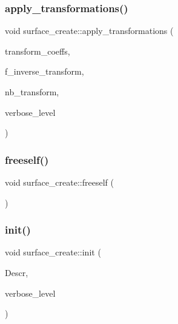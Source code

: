 \subsubsection{\texorpdfstring{apply\+\_\+transformations()}{apply\_transformations()}}
{\footnotesize\ttfamily void surface\+\_\+create\+::apply\+\_\+transformations (\begin{DoxyParamCaption}\item[{const \mbox{\hyperlink{galois_8h_ab6cc7b4aeb6ea31aba2b3fbfc83ff5e6}{B\+Y\+TE}} $\ast$$\ast$}]{transform\+\_\+coeffs,  }\item[{\mbox{\hyperlink{galois_8h_a09fddde158a3a20bd2dcadb609de11dc}{I\+NT}} $\ast$}]{f\+\_\+inverse\+\_\+transform,  }\item[{\mbox{\hyperlink{galois_8h_a09fddde158a3a20bd2dcadb609de11dc}{I\+NT}}}]{nb\+\_\+transform,  }\item[{\mbox{\hyperlink{galois_8h_a09fddde158a3a20bd2dcadb609de11dc}{I\+NT}}}]{verbose\+\_\+level }\end{DoxyParamCaption})}

\mbox{\label{classsurface__create_a5a9aff32d0fff342dd6e09fdaba9fd82}} 
\subsubsection{\texorpdfstring{freeself()}{freeself()}}
{\footnotesize\ttfamily void surface\+\_\+create\+::freeself (\begin{DoxyParamCaption}{ }\end{DoxyParamCaption})}

\mbox{\label{classsurface__create_ab0db5c12825f778e3caf8aa4da02eb06}} 
\subsubsection{\texorpdfstring{init()}{init()}}
{\footnotesize\ttfamily void surface\+\_\+create\+::init (\begin{DoxyParamCaption}\item[{\mbox{\hyperlink{classsurface__create__description}{surface\+\_\+create\+\_\+description}} $\ast$}]{Descr,  }\item[{\mbox{\hyperlink{galois_8h_a09fddde158a3a20bd2dcadb609de11dc}{I\+NT}}}]{verbose\+\_\+level }\end{DoxyParamCaption})}

